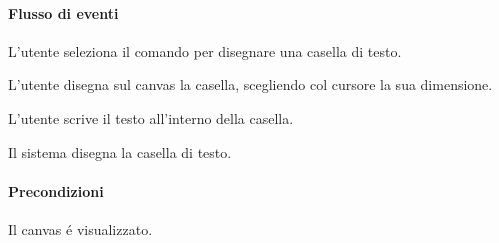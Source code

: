 \paragraph{Flusso di eventi}
\begin{elenconumerato}[\textbf{}]{\subsubsecindent}
\item L'utente seleziona il comando per disegnare una casella di testo.
\item L'utente disegna sul canvas la casella, scegliendo col cursore la sua dimensione.
\item L'utente scrive il testo all'interno della casella.
\item Il sistema disegna la casella di testo.
\end{elenconumerato}
\paragraph{Precondizioni} Il canvas \'e visualizzato.
